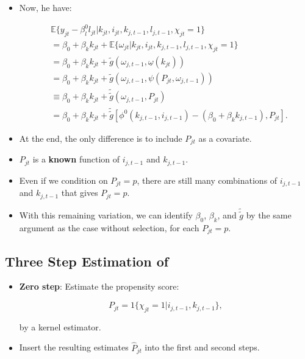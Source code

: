 \documentclass[]{book}
\providecommand{\tightlist}{%
  \setlength{\itemsep}{0pt}\setlength{\parskip}{0pt}}
\theoremstyle{definition}
\theoremstyle{definition}
\theoremstyle{definition}
\theoremstyle{remark}
\begin{document}
\begin{itemize}
\tightlist
\item
  Now, he have:

  \begin{equation}
  \begin{split}
  &\mathbb{E}\{y_{jt} - \beta_l^0 l_{jt}|k_{jt}, i_{jt}, k_{j, t - 1}, l_{j, t - 1}, \chi_{jt} = 1\} \\
  &= \beta_0 + \beta_k k_{jt} + \mathbb{E}\{\omega_{jt}| k_{jt}, i_{jt}, k_{j, t - 1}, l_{j, t - 1} , \chi_{jt} = 1\}\\
  &= \beta_0 + \beta_k k_{jt} + \tilde{g}(\omega_{j, t - 1}, \underline{\omega}(k_{jt}))\\
  &= \beta_0 + \beta_k k_{jt} + \tilde{g}(\omega_{j, t - 1}, \psi(P_{jt}, \omega_{j, t - 1}))\\
  &\equiv \beta_0 + \beta_k k_{jt} + \tilde{\tilde{g}}(\omega_{j, t - 1}, P_{jt})\\
  &= \beta_0 + \beta_k k_{jt} + \tilde{\tilde{g}}[\phi^0(k_{j, t - 1}, i_{j, t - 1}) - (\beta_0 + \beta_k k_{j, t - 1}), P_{jt}].
  \end{split}
  \end{equation}
\item
  At the end, the only difference is to include \(P_{jt}\) as a
  covariate.
\item
  \(P_{jt}\) is a \textbf{known} function of \(i_{j, t - 1}\) and
  \(k_{j, t - 1}\).
\item
  Even if we condition on \(P_{jt} = p\), there are still many
  combinations of \(i_{j, t - 1}\) and \(k_{j, t - 1}\) that gives
  \(P_{jt} = p\).
\item
  With this remaining variation, we can identify \(\beta_0\),
  \(\beta_k\), and \(\tilde{\tilde{g}}\) by the same argument as the
  case without selection, for each \(P_{jt} = p\).
\end{itemize}

\subsection{\texorpdfstring{Three Step Estimation of
\citet{Olley1996}}{Three Step Estimation of @Olley1996}}\label{three-step-estimation-of-olley1996}

\begin{itemize}
\tightlist
\item
  \textbf{Zero step}: Estimate the propensity score:

  \begin{equation}
  P_{jt} = 1\{\chi_{jt} = 1| i_{j, t - 1}, k_{j, t - 1}\},
  \end{equation}

  by a kernel estimator.
\item
  Insert the resulting estimates \(\widehat{P}_{jt}\) into the first and
  second steps.
\end{itemize}
\end{document}

